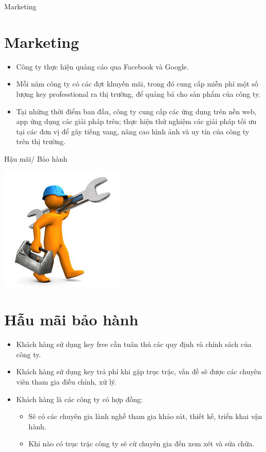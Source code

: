 \documentclass{beamer}
\begin{document}
\begin{frame}{Marketing}
\section{Marketing}
\begin{itemize}
\item Công ty thực hiện quảng cáo qua Facebook và Google.

\item Mỗi năm công ty có các đợt khuyến mãi, trong đó cung cấp miễn phí một số lượng key professtional ra thị trường, để quảng bá cho sản phẩm của công ty.

\item Tại những thời điểm ban đầu, công ty cung cấp các ứng dụng trên nền web, app ứng dụng các giải pháp trên; thực hiện thử nghiệm các giải pháp tối ưu tại các đơn vị để gây tiếng vang, nâng cao hình ảnh và uy tín của công ty trên thị trường.


\end{itemize}

\end{frame}
\begin{frame}{Hậu mãi/ Bảo hành}
\begin{center}
\includegraphics[scale=0.5]{8.jpg}
\end{center}
\section{Hẫu mãi bảo hành}
\begin{itemize}
\item Khách hàng sử dụng key free cần tuân thủ các quy định và chính sách của công ty.

\item Khách hàng sử dụng key trả phí khi gặp trục trặc, vấn đề sẽ được các chuyên viên tham gia điều chỉnh, xử lý.

\item Khách hàng là các công ty có hợp đồng:
\begin{itemize}
\item Sẽ có các chuyên gia lành nghề tham gia khảo sát, thiết kế, triển khai vận hành.
\item Khi nào có trục trặc công ty sẽ cử chuyên gia đến xem xét và sửa chữa.
\end{itemize}
\end{itemize}
\end{frame}
\end{document}
